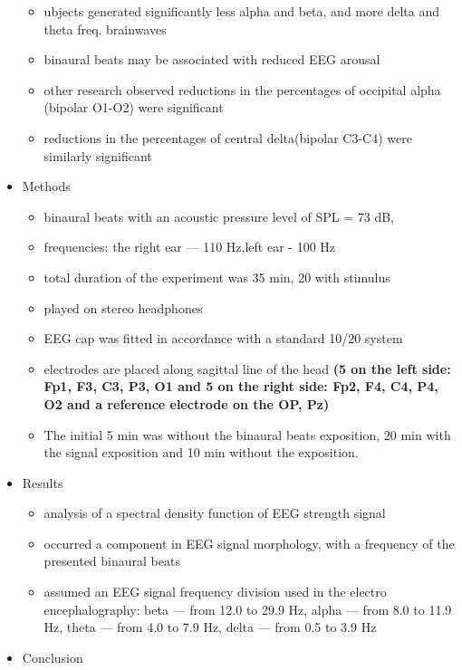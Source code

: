 \documentclass[a4paper]{article}
\begin{document}
\begin{itemize}
\begin{itemize}
              \item ubjects generated significantly less alpha and beta, and more delta and theta freq. brainwaves
              \item binaural beats may be associated with
                    reduced EEG arousal
              \item other research observed reductions in the percentages of occipital alpha (bipolar O1-O2) were signiﬁcant
              \item reductions in the percentages of central delta(bipolar C3-C4) were similarly signiﬁcant
          \end{itemize}
    \item Methods
          \begin{itemize}
              \item binaural beats with an acoustic pressure level of SPL = 73 dB,
              \item frequencies: the right ear — 110 Hz,left ear - 100 Hz
              \item total duration of the experiment was 35 min, 20 with stimulus
              \item played on stereo headphones
              \item EEG cap was fitted in accordance with a standard 10/20 system
              \item electrodes are placed along sagittal line of the head \textbf{(5 on the left side: Fp1, F3, C3, P3, O1 and 5 on the right side: Fp2, F4, C4, P4, O2 and a reference electrode on the OP, Pz)}
              \item The initial 5 min was without the binaural beats exposition, 20 min with the signal exposition and 10 min without the exposition.
          \end{itemize}
    \item Results
          \begin{itemize}
              \item analysis of a spectral density function of EEG strength signal
              \item occurred a component in EEG signal morphology, with a frequency of the presented binaural beats
              \item assumed an EEG signal frequency division used in the electro encephalography: beta — from 12.0 to 29.9 Hz, alpha — from 8.0 to 11.9 Hz, theta — from 4.0 to 7.9 Hz, delta — from 0.5 to 3.9 Hz
          \end{itemize}
    \item Conclusion

\end{itemize}
\end{document}
